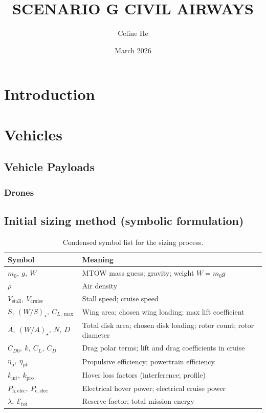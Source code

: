 \documentclass[11pt, a4paper]{article}
\title{SCENARIO G CIVIL AIRWAYS}
\author{Celine He}
\date{March 2026}
\begin{document}
\maketitle

\tableofcontents

\section{Introduction}

\section{Vehicles}

\subsection{Vehicle Payloads}

\subsubsection{Drones}

\subsection{Initial sizing method (symbolic formulation)}


\begin{table}[h!]
\centering
\small
\renewcommand{\arraystretch}{1.2}
\begin{tabular}{ll}
\hline
Symbol & Meaning \\
\hline
$m_0,\ g,\ W$ & MTOW mass guess; gravity; weight $W=m_0 g$ \\
$\rho$ & Air density \\
$V_{\mathrm{stall}},\ V_{\mathrm{cruise}}$ & Stall speed; cruise speed \\
$S,\ (W/S)_\star,\ C_{L,\max}$ & Wing area; chosen wing loading; max lift coefficient \\
$A,\ (W/A)_\star,\ N,\ D$ & Total disk area; chosen disk loading; rotor count; rotor diameter \\
$C_{D0},\ k,\ C_L,\ C_D$ & Drag polar terms; lift and drag coefficients in cruise \\
$\eta_{\mathrm{p}},\ \eta_{\mathrm{pt}}$ & Propulsive efficiency; powertrain efficiency \\
$k_{\mathrm{int}},\ k_{\mathrm{pro}}$ & Hover loss factors (interference; profile) \\
$P_{\mathrm{h,elec}},\ P_{\mathrm{c,elec}}$ & Electrical hover power; electrical cruise power \\
$\lambda,\ \mathcal{E}_{\mathrm{tot}}$ & Reserve factor; total mission energy \\
\hline
\end{tabular}
\caption{Condensed symbol list for the sizing process.}
\end{table}
\end{document}

